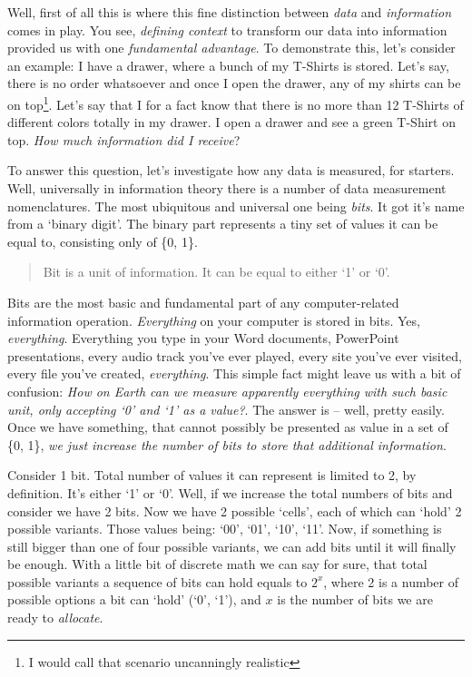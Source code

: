 \documentclass{report}
\begin{document}
            Well, first of all this is where this fine distinction between \emph{data} and \emph{information} comes in play. You see, \emph{defining context} to transform
            our data into information provided us with one \emph{fundamental advantage}. To demonstrate this, let's consider an example: I have a drawer, where a bunch
            of my T-Shirts is stored. Let's say, there is no order whatsoever and once I open the drawer, any of my shirts can be on top\footnote{I would call
            that scenario uncanningly realistic}. Let's say that I for a fact know that there is no more than 12 T-Shirts of different colors totally in my drawer.
            I open a drawer and see a green T-Shirt on top. \emph{How much information did I receive}? \par

            To answer this question, let's investigate how any data is measured, for starters. Well, universally in information theory there is a number of data 
            measurement nomenclatures. The most ubiquitous and universal one being \emph{bits}. It got it's name from a `binary digit'. The binary part represents a
            tiny set of values it can be equal to, consisting only of \{0, 1\}.

            \begin{quote}
                Bit is a unit of information. It can be equal to either `1' or `0'.
            \end{quote}

            Bits are the most basic and fundamental part of any computer-related information operation. \emph{Everything} on your computer is stored in bits. Yes, 
            \emph{everything}. Everything you type in your Word documents, PowerPoint presentations, every audio track you've ever played, every site you've ever 
            visited, every file you've created, \emph{everything}. This simple fact might leave us with a bit of confusion: \emph{How on Earth can we measure apparently
            everything with such basic unit, only accepting `0' and `1' as a value?}. The answer is -- well, pretty easily. Once we have something, that cannot possibly
            be presented as value in a set of \{0, 1\}, \emph{we just increase the number of bits to store that additional information}. \par

            Consider 1 bit. Total number of values it can represent is limited to 2, by definition. It's either `1' or `0'. Well, if we increase the total numbers
            of bits and consider we have 2 bits. Now we have 2 possible `cells', each of which can `hold' 2 possible variants. Those values being: `00', `01', `10', `11'.
            Now, if something is still bigger than one of four possible variants, we can add bits until it will finally be enough. With a little bit of discrete math
            we can say for sure, that total possible variants a sequence of bits can hold equals to $2^x$, where 2 is a number of possible options a bit can `hold' (`0', `1'), 
            and $x$ is the number of bits we are ready to \emph{allocate}.
            
\end{document}
